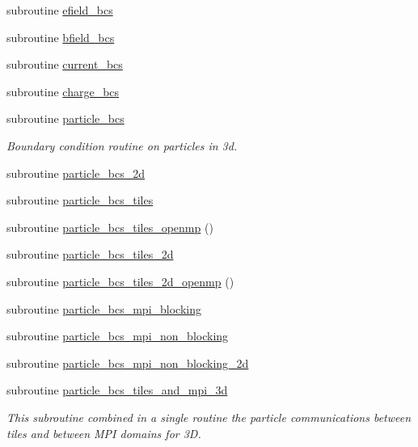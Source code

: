\begin{DoxyCompactItemize}
\item 
subroutine \hyperlink{namespaceboundary_a2397a80ea9511ae3266ad16c668cc547}{efield\+\_\+bcs}
\item 
subroutine \hyperlink{namespaceboundary_af2316f12b3b85debc7214c4c47035322}{bfield\+\_\+bcs}
\item 
subroutine \hyperlink{namespaceboundary_a2bd382bbf256b1208d4fd3721c37ad08}{current\+\_\+bcs}
\item 
subroutine \hyperlink{namespaceboundary_a0b6d77029b51dd2a0e853c265885ab6c}{charge\+\_\+bcs}
\item 
subroutine \hyperlink{namespaceboundary_a9e7ba00d025d595683607b3ccd95bcb3}{particle\+\_\+bcs}
\begin{DoxyCompactList}\small\item\em Boundary condition routine on particles in 3d. \end{DoxyCompactList}\item 
subroutine \hyperlink{namespaceboundary_aad89819169dca0b0ae8cf04748a86fb1}{particle\+\_\+bcs\+\_\+2d}
\item 
subroutine \hyperlink{namespaceboundary_added6cf2ea0ffc7ab618c3d9af16fade}{particle\+\_\+bcs\+\_\+tiles}
\item 
subroutine \hyperlink{namespaceboundary_af6d7a140eef6818609e44869b67cd3a7}{particle\+\_\+bcs\+\_\+tiles\+\_\+openmp} ()
\item 
subroutine \hyperlink{namespaceboundary_afb4e6ab09e288dab2bb9ce2d731e276f}{particle\+\_\+bcs\+\_\+tiles\+\_\+2d}
\item 
subroutine \hyperlink{namespaceboundary_a9f9517df19ef503bb2a69e63aeec91d4}{particle\+\_\+bcs\+\_\+tiles\+\_\+2d\+\_\+openmp} ()
\item 
subroutine \hyperlink{namespaceboundary_a1789d63402ac897697791a2fca4fa8e6}{particle\+\_\+bcs\+\_\+mpi\+\_\+blocking}
\item 
subroutine \hyperlink{namespaceboundary_aac32f7f65f1998963706f9d5776d29d2}{particle\+\_\+bcs\+\_\+mpi\+\_\+non\+\_\+blocking}
\item 
subroutine \hyperlink{namespaceboundary_a3293856926030dfea9e8ca05c61e1a5a}{particle\+\_\+bcs\+\_\+mpi\+\_\+non\+\_\+blocking\+\_\+2d}
\item 
subroutine \hyperlink{namespaceboundary_ac117306978e83b787afba90c3ac038f4}{particle\+\_\+bcs\+\_\+tiles\+\_\+and\+\_\+mpi\+\_\+3d}
\begin{DoxyCompactList}\small\item\em This subroutine combined in a single routine the particle communications between tiles and between M\+PI domains for 3D. \end{DoxyCompactList}\end{DoxyCompactItemize}


